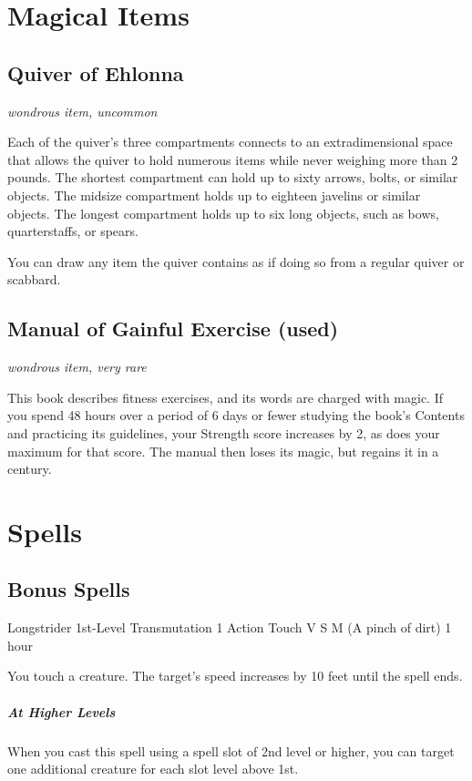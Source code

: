 \documentclass[letterpaper,openany,oneside,twocolumn]{book}
\begin{document}
\section*{Magical Items}
\subsection*{Quiver of Ehlonna}
\textit{wondrous item, uncommon}

Each of the quiver's three compartments connects to an extradimensional space that allows the quiver to hold numerous items while never weighing more than 2 pounds. The shortest compartment can hold up to sixty arrows, bolts, or similar objects. The midsize compartment holds up to eighteen javelins or similar objects. The longest compartment holds up to six long objects, such as bows, quarterstaffs, or spears.

You can draw any item the quiver contains as if doing so from a regular quiver or scabbard.

\subsection*{Manual of Gainful Exercise (used)}
\textit{wondrous item, very rare}

This book describes fitness exercises, and its words are charged with magic. If you spend 48 hours over a period of 6 days or fewer studying the book's Contents and practicing its guidelines, your Strength score increases by 2, as does your maximum for that score. The manual then loses its magic, but regains it in a century.

\section*{Spells}

\subsection*{Bonus Spells}

\DndSpellHeader
  {Longstrider}
  {1st-Level Transmutation}
  {1 Action}
  {Touch}
  {V S M (A pinch of dirt)}
  {1 hour}

You touch a creature. The target's speed increases by 10 feet until the spell ends.

\subparagraph*{At Higher Levels} When you cast this spell using a spell slot of 2nd level or higher, you can target one additional creature for each slot level above 1st.
\end{document}
